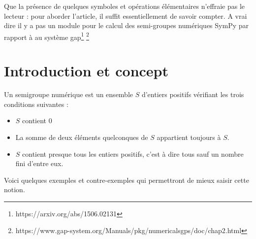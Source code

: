 Que la présence de quelques symboles et opérations élémentaires n’effraie pas le lecteur : pour aborder l’article, il suffit essentiellement de savoir compter. A vrai dire il y a pas un module pour le calcul
des semi-groupes numériques SymPy par rapport à au système gap\footnote{https://arxiv.org/abs/1506.02131} \footnote{https://www.gap-system.org/Manuals/pkg/numericalsgps/doc/chap2.html}
\section{Introduction et concept}

\begin{definition}
 Un semigroupe numérique est un ensemble $S$ d’entiers positifs vérifiant les trois conditions suivantes :
 \begin{itemize}
   \item $S$ contient $0$
   \item La somme de deux éléments quelconques de $S$ appartient toujours à $S$.
   \item $S$ contient presque tous les entiers positifs, c’est à dire tous sauf un nombre fini d’entre eux.
 \end{itemize}
\end{definition}
Voici quelques exemples et contre-exemples qui permettront de mieux saisir cette notion.
